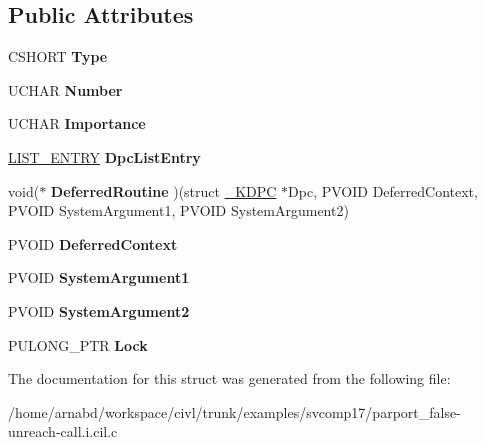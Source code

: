 \subsection*{Public Attributes}
\begin{DoxyCompactItemize}
\item 
\hypertarget{struct__KDPC_a7bd028ca923bff381ec138f9c6dfa82f}{}C\+S\+H\+O\+R\+T {\bfseries Type}\label{struct__KDPC_a7bd028ca923bff381ec138f9c6dfa82f}

\item 
\hypertarget{struct__KDPC_afb4baa35b5c5e2345150731786ebfc7b}{}U\+C\+H\+A\+R {\bfseries Number}\label{struct__KDPC_afb4baa35b5c5e2345150731786ebfc7b}

\item 
\hypertarget{struct__KDPC_aa71047105ced3f66d95cfacfa44c03f1}{}U\+C\+H\+A\+R {\bfseries Importance}\label{struct__KDPC_aa71047105ced3f66d95cfacfa44c03f1}

\item 
\hypertarget{struct__KDPC_a2f30976599998c136d507be1e50c3885}{}\hyperlink{struct__LIST__ENTRY}{L\+I\+S\+T\+\_\+\+E\+N\+T\+R\+Y} {\bfseries Dpc\+List\+Entry}\label{struct__KDPC_a2f30976599998c136d507be1e50c3885}

\item 
\hypertarget{struct__KDPC_a1c7a836fdb593da3645b1c04d7baaee1}{}void($\ast$ {\bfseries Deferred\+Routine} )(struct \hyperlink{struct__KDPC}{\+\_\+\+K\+D\+P\+C} $\ast$Dpc, P\+V\+O\+I\+D Deferred\+Context, P\+V\+O\+I\+D System\+Argument1, P\+V\+O\+I\+D System\+Argument2)\label{struct__KDPC_a1c7a836fdb593da3645b1c04d7baaee1}

\item 
\hypertarget{struct__KDPC_afab58e439f0c087f117efcec61af8b60}{}P\+V\+O\+I\+D {\bfseries Deferred\+Context}\label{struct__KDPC_afab58e439f0c087f117efcec61af8b60}

\item 
\hypertarget{struct__KDPC_aad04a98483f7ee23d3560ad57b84be45}{}P\+V\+O\+I\+D {\bfseries System\+Argument1}\label{struct__KDPC_aad04a98483f7ee23d3560ad57b84be45}

\item 
\hypertarget{struct__KDPC_aa10961cb876bc31336d39bcf0162a0fa}{}P\+V\+O\+I\+D {\bfseries System\+Argument2}\label{struct__KDPC_aa10961cb876bc31336d39bcf0162a0fa}

\item 
\hypertarget{struct__KDPC_a6e53ec50931dd73778f111a721e1d8bf}{}P\+U\+L\+O\+N\+G\+\_\+\+P\+T\+R {\bfseries Lock}\label{struct__KDPC_a6e53ec50931dd73778f111a721e1d8bf}

\end{DoxyCompactItemize}


The documentation for this struct was generated from the following file\+:\begin{DoxyCompactItemize}
\item 
/home/arnabd/workspace/civl/trunk/examples/svcomp17/parport\+\_\+false-\/unreach-\/call.\+i.\+cil.\+c\end{DoxyCompactItemize}
